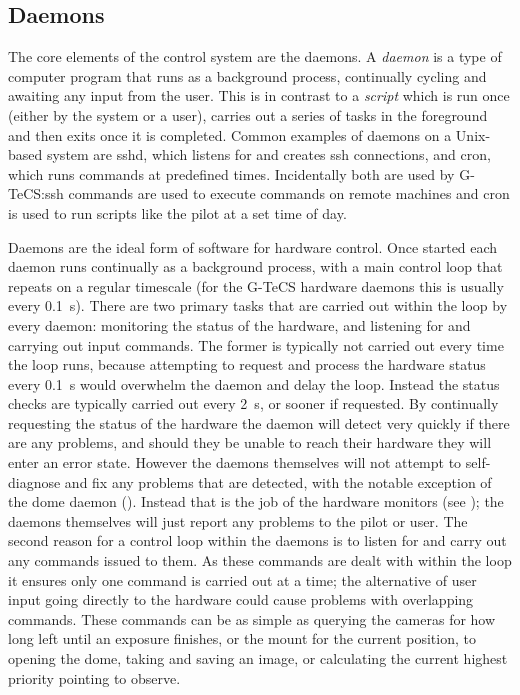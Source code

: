 \begin{colsection}
\begin{colsection}
\end{colsection}


\subsection{Daemons}
\label{sec:daemons}
\begin{colsection}


The core elements of the control system are the daemons. A \emph{daemon} is a type of computer program that runs as a background process, continually cycling and awaiting any input from the user. This is in contrast to a \emph{script} which is run once (either by the system or a user), carries out a series of tasks in the foreground and then exits once it is completed. Common examples of daemons on a Unix-based system are sshd, which listens for and creates \gls{ssh} connections, and cron, which runs commands at predefined times. Incidentally both are used by G-TeCS:\@ \gls{ssh} commands are used to execute commands on remote machines and cron is used to run scripts like the pilot at a set time of day.

Daemons are the ideal form of software for hardware control. Once started each daemon runs continually as a background process, with a main control loop that repeats on a regular timescale (for the G-TeCS hardware daemons this is usually every \SI{0.1}{\second}). There are two primary tasks that are carried out within the loop by every daemon: monitoring the status of the hardware, and listening for and carrying out input commands. The former is typically not carried out every time the loop runs, because attempting to request and process the hardware status every \SI{0.1}{\second} would overwhelm the daemon and delay the loop. Instead the status checks are typically carried out every \SI{2}{\second}, or sooner if requested. By continually requesting the status of the hardware the daemon will detect very quickly if there are any problems, and should they be unable to reach their hardware they will enter an error state. However the daemons themselves will not attempt to self-diagnose and fix any problems that are detected, with the notable exception of the dome daemon (). Instead that is the job of the hardware monitors (see ); the daemons themselves will just report any problems to the pilot or user. The second reason for a control loop within the daemons is to listen for and carry out any commands issued to them. As these commands are dealt with within the loop it ensures only one command is carried out at a time; the alternative of user input going directly to the hardware could cause problems with overlapping commands. These commands can be as simple as querying the cameras for how long left until an exposure finishes, or the mount for the current position, to opening the dome, taking and saving an image, or calculating the current highest priority pointing to observe.


\end{colsection}
\end{colsection}
